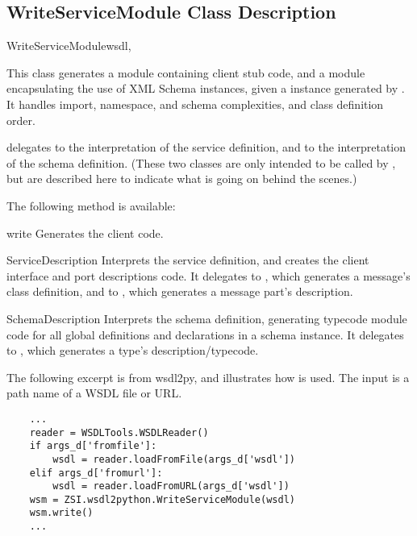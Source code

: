 \subsection{WriteServiceModule Class Description}

\begin{classdesc}{WriteServiceModule}{wsdl, }

This class generates a module containing client stub code, and a module
encapsulating the use of XML Schema instances, given a 
instance generated by .
It handles import, namespace, and schema complexities, and class definition
order.

 delegates to  the
interpretation
of the service definition, and to  the interpretation
of the schema definition.  (These two classes are only intended to be called
by , but are described here to indicate what
is going on behind the scenes.)

The following method is available:

\begin{methoddesc}{write}{}
Generates the client code.
\end{methoddesc}

\end{classdesc}

\begin{classdesc}{ServiceDescription}{}
Interprets the service definition, and creates the client interface and
port descriptions code.  It delegates to , which
generates a message's class definition, and to , which
generates a message part's description.
\end{classdesc}

\begin{classdesc}{SchemaDescription}{}
Interprets the schema definition, generating typecode module code
for all global definitions and declarations in a schema instance.
It delegates to , which generates a type's
description/typecode.
\end{classdesc}

The following excerpt is from wsdl2py, and illustrates how
 is used.  The input is a 
path name of a WSDL file or URL.

\begin{verbatim}
    ...
    reader = WSDLTools.WSDLReader()
    if args_d['fromfile']:
        wsdl = reader.loadFromFile(args_d['wsdl'])
    elif args_d['fromurl']:
        wsdl = reader.loadFromURL(args_d['wsdl'])
    wsm = ZSI.wsdl2python.WriteServiceModule(wsdl)
    wsm.write()
    ...
\end{verbatim}


